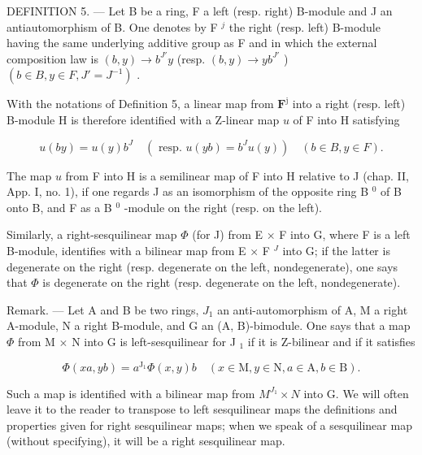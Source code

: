 DEFINITION 5. --- Let B be a ring, F a left (resp. right) B-module and J an antiautomorphism of B. One denotes by F \(^{j}\) the right (resp. left) B-module having the same underlying additive group as F and in which the external composition law is \((b, y) \to b^{J'}y\) (resp. \((b, y) \to yb^{J'}\) ) \((b \in B, y \in F, J' = J^{-1})\) .

With the notations of Definition 5, a linear map from \(\mathbf{F}^{\mathrm{j}}\) into a right (resp. left) B-module H is therefore identified with a Z-linear map \(u\) of F into H satisfying

\[
u (b y) = u (y) b ^ {J} \quad (\text { resp. } u (y b) = b ^ {J} u (y)) \quad (b \in B, y \in F).
\]

The map \(u\) from F into H is a semilinear map of F into H relative to J (chap. II, App. I, no. 1), if one regards J as an isomorphism of the opposite ring B \(^{0}\) of B onto B, and F as a B \(^{0}\) -module on the right (resp. on the left).

Similarly, a right-sesquilinear map \(\Phi\) (for J) from E × F into G, where F is a left B-module, identifies with a bilinear map from E × F \(^{J}\) into G; if the latter is degenerate on the right (resp. degenerate on the left, nondegenerate), one says that \(\Phi\) is degenerate on the right (resp. degenerate on the left, nondegenerate).

Remark. --- Let A and B be two rings, \(J_{1}\) an anti-automorphism of A, M a right A-module, N a right B-module, and G an (A, B)-bimodule. One says that a map \(\Phi\) from M \(\times\) N into G is left-sesquilinear for J \(_{1}\) if it is Z-bilinear and if it satisfies

\[
\Phi (x a, y b) = a ^ {\mathrm{J} _ {1}} \Phi (x, y) b \quad (x \in \mathrm{M}, y \in \mathrm{N}, a \in \mathrm{A}, b \in \mathrm{B}).\tag{9}
\]

Such a map is identified with a bilinear map from \(M^{J_{1}} \times N\) into G. We will often leave it to the reader to transpose to left sesquilinear maps the definitions and properties given for right sesquilinear maps; when we speak of a sesquilinear map (without specifying), it will be a right sesquilinear map.

